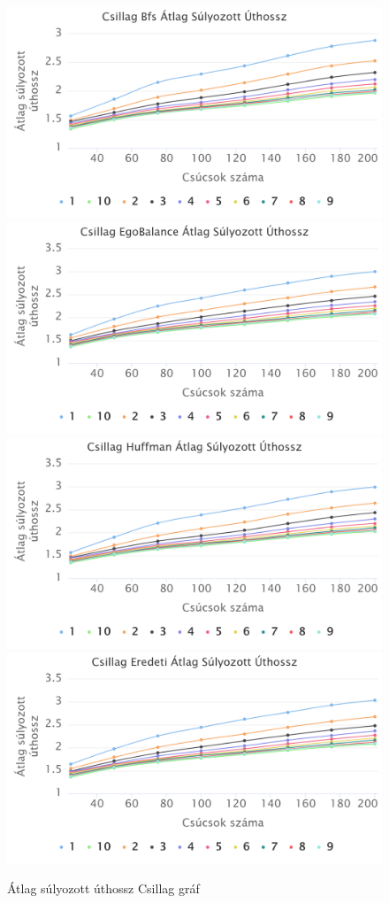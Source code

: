\documentclass[12pt]{report}
\begin{document}
\begin{figure}[H]
	\begin{center}
		\includegraphics[width=0.49\linewidth]{pictures/star_avg_len_bfs.png}
		\includegraphics[width=0.49\linewidth]{pictures/star_avg_len_egobalance.png}
		\includegraphics[width=0.49\linewidth]{pictures/star_avg_len_huffman.png}
		\includegraphics[width=0.49\linewidth]{pictures/star_avg_len_original.png}
		\caption{Átlag súlyozott úthossz Csillag gráf}
		\label{avg-len-star}
	\end{center}
\end{figure}
\end{document}
